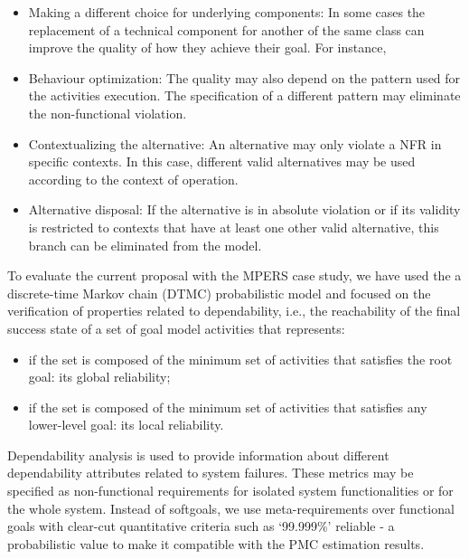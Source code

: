 \begin{itemize}

\item Making a different choice for underlying components: In some cases the replacement of a technical component for another of the same class can improve the quality of how they achieve their goal. For instance,
\medskip

\item Behaviour optimization: The quality may also depend on the pattern used for the activities execution. The specification of a different pattern may eliminate the non-functional violation. 
\medskip

\item Contextualizing the alternative: An alternative may only violate a NFR in specific contexts. In this case, different valid alternatives may be used according to the context of operation.
\medskip

\item Alternative disposal: If the alternative is in absolute violation or if its validity is restricted to contexts that have at least one other valid alternative, this branch can be eliminated from the model.

\end{itemize}

To evaluate the current proposal with the MPERS case study, we have used the a discrete-time Markov chain (DTMC) probabilistic model and focused on the verification of properties related to dependability, i.e., the reachability of the final success state of a set of goal model activities that represents: 

\begin{itemize}

\item if the set is composed of the minimum set of activities that satisfies the root goal: its global reliability;  

\item if the set is composed of the minimum set of activities that satisfies any lower-level goal: its local reliability.

\end{itemize}

Dependability analysis is used to provide information about different dependability attributes related to system failures. These metrics may be specified as non-functional requirements for isolated system functionalities or for the whole system. Instead of softgoals, we use meta-requirements over functional goals with clear-cut quantitative criteria such as `99.999\%' reliable - a probabilistic value to make it compatible with the PMC estimation results.

